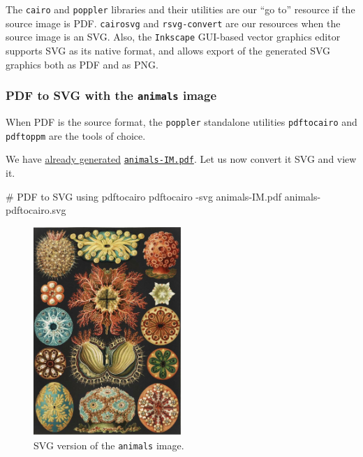 \documentclass[
  12pt,
  british,
  a4paper,
  rgb,
  dvipsnames,
  svgnames,
  hyphens]{article}
\newenvironment{Shaded}{\begin{snugshade}}{\end{snugshade}}
\newcommand{\AttributeTok}[1]{\textcolor[rgb]{0.80,0.80,0.80}{#1}}
\newcommand{\CommentTok}[1]{\textcolor[rgb]{0.50,0.62,0.50}{#1}}
\newcommand{\ExtensionTok}[1]{\textcolor[rgb]{0.80,0.80,0.80}{#1}}
\newcommand{\NormalTok}[1]{\textcolor[rgb]{0.80,0.80,0.80}{#1}}
\begin{document}
The \texttt{cairo} and \texttt{poppler} libraries and their utilities
are our ``go to'' resource if the source image is PDF. \texttt{cairosvg}
and \texttt{rsvg-convert} are our resources when the source image is an
SVG. Also, the \texttt{Inkscape} GUI-based vector graphics editor
supports SVG as its native format, and allows export of the generated
SVG graphics both as PDF and as PNG.

\hypertarget{pdf-to-svg-with-the-animals-image}{%
\subsubsection{\texorpdfstring{PDF to SVG with the \texttt{animals}
image}{PDF to SVG with the animals image}}\label{pdf-to-svg-with-the-animals-image}}

When PDF is the source format, the \texttt{poppler} standalone utilities
\texttt{pdftocairo} and \texttt{pdftoppm} are the tools of choice.

We have
\protect\hyperlink{raster-to-pdf-with-convert-for-animals}{already
generated} \href{images/animals-IM.pdf}{\texttt{animals-IM.pdf}}. Let us
now convert it SVG and view it.

\begin{Shaded}
\begin{Highlighting}[]
\CommentTok{\# PDF to SVG using pdftocairo}
\ExtensionTok{pdftocairo} \AttributeTok{{-}svg}\NormalTok{ animals{-}IM.pdf animals{-}pdftocairo.svg}
\end{Highlighting}
\end{Shaded}

\begin{figure}
\hypertarget{fig:animals-pdftocairo-svg}{%
\centering
\includegraphics[width=0.5\textwidth,height=\textheight]{images/animals-pdftocairo.svg}
\caption{SVG version of the \texttt{animals}
image.}\label{fig:animals-pdftocairo-svg}
}
\end{figure}
\end{document}
